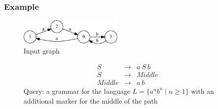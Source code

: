 \documentclass[xcolor=table]{beamer}
\begin{document}
\begin{frame}
  \transwipe[direction=90]
  \frametitle{Example}
\begin{figure}[ht]
    \centering
        \includegraphics[width=0.45\textwidth]{pictures/input.pdf}\\
        Input graph
\end{figure}
\begin{figure}[ht]
\centering
   \[
\begin{array}{rrl} 
   S & \rightarrow & a \ S \ b \\
   S & \rightarrow & Middle \\
   Middle & \rightarrow & a \ b
\end{array}
\]
   Query: a grammar for the language $L=\{a^n b^n \mid n \geq 1\}$ with an additional marker for the middle of the path
   \label{grammarG}        
    \end{figure}
\end{frame}
\end{document}
